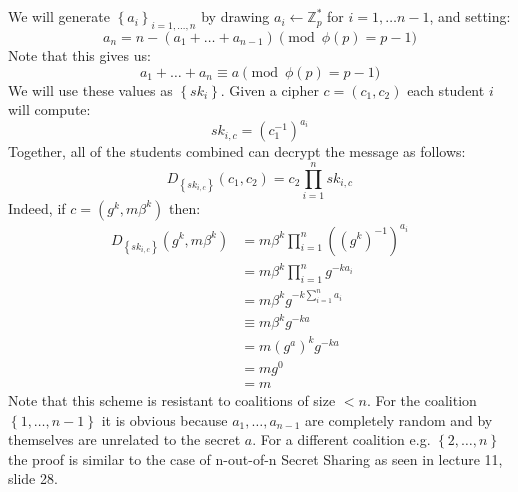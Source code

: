 \documentclass{article}
\begin{document}
\pagebreak



\section{}%
\subsection{}%
We will generate $\left\{ a_{i}\right\} _{i=1,\ldots,n}$ by drawing
$a_{i}\leftarrow\mathbb{Z}_{p}^{*}$ for $i=1,\ldots n-1$, and setting:
\[
a_{n}=n-(a_{1}+\ldots+a_{n-1})\pmod{\phi(p)=p-1}
\]
Note that this gives us:
\[
a_{1}+\ldots+a_{n}\equiv a\pmod{\phi(p)=p-1}
\]
We will use these values as $\left\{ sk_{i}\right\} $. Given a cipher
$c=\left(c_{1},c_{2}\right)$ each student $i$ will compute:
\[
sk_{i,c}=\left(c_{1}^{-1}\right)^{a_{i}}
\]
Together, all of the students combined can decrypt the message as
follows:
\[
D_{\left\{ sk_{i,c}\right\} }(c_{1},c_{2})=c_{2}\prod_{i=1}^{n}sk_{i,c}
\]
Indeed, if $c=\left(g^{k},m\beta^{k}\right)$ then:
\begin{align*}
D_{\left\{ sk_{i,c}\right\} }\left(g^{k},m\beta^{k}\right) & =m\beta^{k}\prod_{i=1}^{n}\left(\left(g^{k}\right)^{-1}\right)^{a_{i}}\\
 & =m\beta^{k}\prod_{i=1}^{n}g^{-ka_{i}}\\
 & =m\beta^{k}g^{-k\sum_{i=1}^{n}a_{i}}\\
 & \equiv m\beta^{k}g^{-ka}\\
 & =m\left(g^{a}\right)^{k}g^{-ka}\\
 & =mg^{0}\\
 & =m
\end{align*}
Note that this scheme is resistant to coalitions of size $<n$. For
the coalition $\left\{ 1,\ldots,n-1\right\} $ it is obvious because
$a_{1},\ldots,a_{n-1}$ are completely random and by themselves are
unrelated to the secret $a$. For a different coalition e.g. $\left\{ 2,\ldots,n\right\} $
the proof is similar to the case of n-out-of-n Secret Sharing as seen
in lecture 11, slide 28.


\subsection{}%
\end{document}
